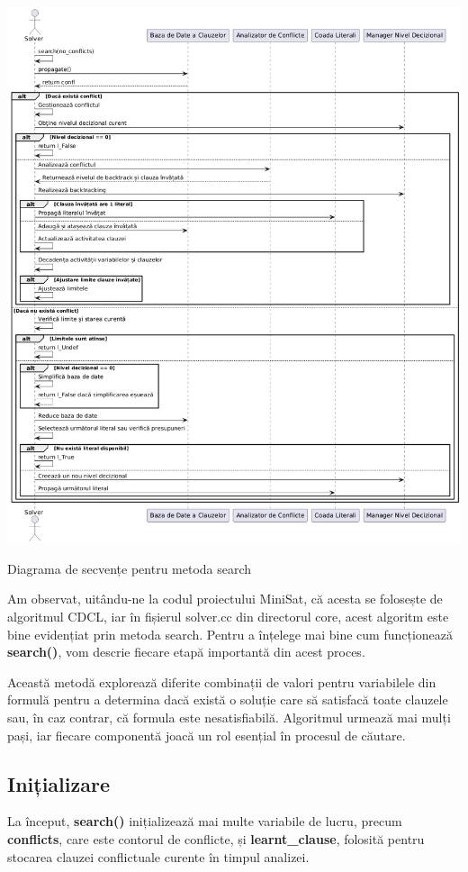 \documentclass[runningheads]{llncs}
\begin{document}
\begin{center} \includegraphics[width=1.0\textwidth]{images/diagrams/search_romana_2.png} \caption{Diagrama de secvențe pentru metoda search} \end{center}

Am observat, uitându-ne la codul proiectului MiniSat, că acesta se folosește de algoritmul CDCL, iar în fișierul solver.cc din directorul core, acest algoritm este bine evidențiat prin metoda search. Pentru a înțelege mai bine cum funcționează \textbf{search()}, vom descrie fiecare etapă importantă din acest proces. \cite{eensorensson2005minisatreport}

Această metodă explorează diferite combinații de valori pentru variabilele din formulă pentru a determina dacă există o soluție care să satisfacă toate clauzele sau, în caz contrar, că formula este nesatisfiabilă. Algoritmul urmează mai mulți pași, iar fiecare componentă joacă un rol esențial în procesul de căutare.

\subsection{Inițializare} La început, \textbf{search()} inițializează mai multe variabile de lucru, precum \textbf{conflicts}, care este contorul de conflicte, și \textbf{learnt\_clause}, folosită pentru stocarea clauzei conflictuale curente în timpul analizei.
\end{document}
